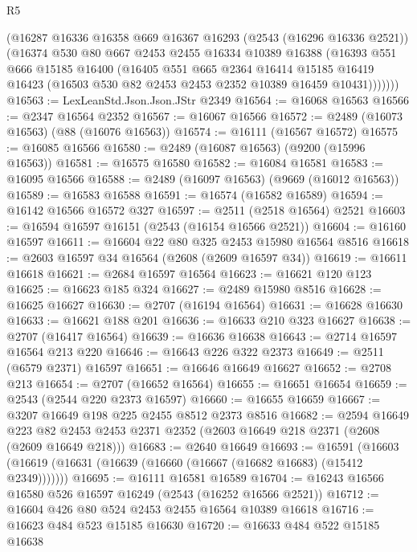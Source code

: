 \begin{lexlean}{R5}
\begin{coremodule}
        (@16287
          @16336
          @16358
          @669
          @16367
          @16293
          (@2543 (@16296 @16336 @2521))
          (@16374
            @530
            @80
            @667
            @2453
            @2455
            @16334
            @10389
            @16388
            (@16393
              @551
              @666
              @15185
              @16400
              (@16405
                @551
                @665
                @2364
                @16414
                @15185
                @16419
                @16423
                (@16503 @530 @82 @2453 @2453 @2352 @10389 @16459 @10431)))))))
@16563 := LexLeanStd.Json.Json.JStr @2349
@16564 := @16068 @16563
@16566 := @2347 @16564 @2352
@16567 := @16067 @16566
@16572 := @2489 (@16073 @16563) (@88 (@16076 @16563))
@16574 := @16111 (@16567 @16572)
@16575 := @16085 @16566
@16580 := @2489 (@16087 @16563) (@9200 (@15996 @16563))
@16581 := @16575 @16580
@16582 := @16084 @16581
@16583 := @16095 @16566
@16588 := @2489 (@16097 @16563) (@9669 (@16012 @16563))
@16589 := @16583 @16588
@16591 := @16574 (@16582 @16589)
@16594 := @16142 @16566 @16572 @327
@16597 := @2511 (@2518 @16564) @2521
@16603 := @16594 @16597 @16151 (@2543 (@16154 @16566 @2521))
@16604 := @16160 @16597
@16611 := @16604 @22 @80 @325 @2453 @15980 @16564 @8516
@16618 := @2603 @16597 @34 @16564 (@2608 (@2609 @16597 @34))
@16619 := @16611 @16618
@16621 := @2684 @16597 @16564
@16623 := @16621 @120 @123
@16625 := @16623 @185 @324
@16627 := @2489 @15980 @8516
@16628 := @16625 @16627
@16630 := @2707 (@16194 @16564)
@16631 := @16628 @16630
@16633 := @16621 @188 @201
@16636 := @16633 @210 @323 @16627
@16638 := @2707 (@16417 @16564)
@16639 := @16636 @16638
@16643 := @2714 @16597 @16564 @213 @220
@16646 := @16643 @226 @322 @2373
@16649 := @2511 (@6579 @2371) @16597
@16651 := @16646 @16649 @16627
@16652 := @2708 @213
@16654 := @2707 (@16652 @16564)
@16655 := @16651 @16654
@16659 := @2543 (@2544 @220 @2373 @16597)
@16660 := @16655 @16659
@16667 := @3207 @16649 @198 @225 @2455 @8512 @2373 @8516
@16682 := @2594
    @16649
    @223
    @82
    @2453
    @2453
    @2371
    @2352
    (@2603 @16649 @218 @2371 (@2608 (@2609 @16649 @218)))
@16683 := @2640 @16649
@16693 := @16591
    (@16603 (@16619 (@16631 (@16639 (@16660 (@16667 (@16682 @16683) (@15412 @2349)))))))
@16695 := @16111 @16581 @16589
@16704 := @16243 @16566 @16580 @526 @16597 @16249 (@2543 (@16252 @16566 @2521))
@16712 := @16604 @426 @80 @524 @2453 @2455 @16564 @10389 @16618
@16716 := @16623 @484 @523 @15185 @16630
@16720 := @16633 @484 @522 @15185 @16638

\end{coremodule}
\end{lexlean}
